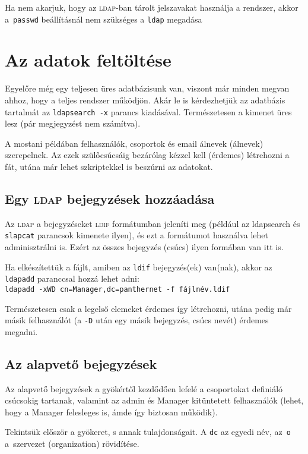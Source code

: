 Ha nem akarjuk, hogy az \textsc{ldap}-ban tárolt jelszavakat használja a rendszer, akkor a~\texttt{passwd} beállításnál nem
szükséges a \texttt{ldap} megadása

\section{Az adatok feltöltése}
Egyelőre még egy teljesen üres adatbázisunk van, viszont már minden megvan ahhoz, hogy a teljes rendszer működjön. Akár
le is kérdezhetjük az adatbázis tartalmát az \texttt{ldapsearch -x} parancs kiadásával. Természetesen a kimenet üres
lesz (pár megjegyzést nem számítva).

A mostani példában felhasználók, csoportok és email álnevek (álnevek) szerepelnek. Az ezek szülőcsúcsáig bezárólag
kézzel kell (érdemes) létrehozni a fát, utána már lehet szkriptekkel is beszúrni az adatokat.



\subsection{Egy \textsc{ldap} bejegyzések hozzáadása}

Az \textsc{ldap} a bejegyzéseket \textsc{ldif} formátumban jeleníti meg (például az ldapsearch és \texttt{slapcat} parancsok kimenete ilyen), és
ezt a formátumot használva lehet adminisztrálni is. Ezért az összes bejegyzés (csúcs) ilyen formában van itt is.

Ha elkészítettük a fájlt, amiben az \texttt{ldif} bejegyzés(ek) van(nak), akkor az \texttt{ldapadd} paranccsal hozzá lehet adni:\\
\texttt{ldapadd -xWD cn=Manager,dc=panthernet -f fájlnév.ldif}

Természetesen csak a legelső elemeket érdemes így létrehozni, utána pedig már másik felhasználót (a \texttt{-D} után egy
másik bejegyzés, csúcs nevét) érdemes megadni.


\subsection{Az alapvető bejegyzések}

Az alapvető bejegyzések a gyökértől kezdődően lefelé a csoportokat definiáló csúcsokig tartanak, valamint az admin és
Manager kitüntetett felhasználók (lehet, hogy a Manager felesleges is, ámde így biztosan működik).

Tekintsük először a gyökeret, s annak tulajdonságait.
A \texttt{dc} az egyedi név, az~\texttt{o} a~szervezet (organization) rövidítése.

